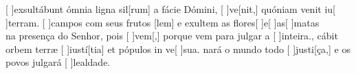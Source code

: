 {  {[ ]{ex}sultábunt ómnia ligna sil[rum] a fácie Dómini, [ ]{ve}[nit,] quóniam venit iu[ ]{ter}ram.}%
    {[ ]{cam}pos com seus frutos [lem] e exultem as flores[ ]{e}[ ]{as}[ ]{ma}tas \\[5pt] na presença do Senhor, pois [ ]{vem}[,] porque vem para julgar a [ ]{in}{tei}ra.},
  {cábit orbem terræ [ ]{iu}{stí}[tia] et pópulos in ve[ ]{su}a.}%
    {nará o mundo todo [ ]{jus}{ti}[ça,] e os povos julgará [ ]{le}{al}{da}de.}
}